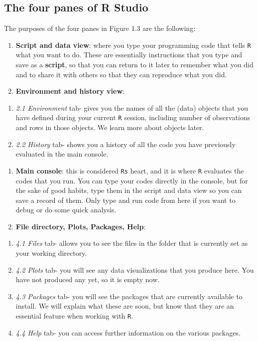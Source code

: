 \documentclass[
]{book}
\begin{document}
\hypertarget{the-four-panes-of-r-studio}{%
\subsection{The four panes of R Studio}\label{the-four-panes-of-r-studio}}

The purposes of the four panes in Figure 1.3 are the following:

\begin{enumerate}
\def\labelenumi{\arabic{enumi}.}
\item
  \textbf{Script and data view}: where you type your programming code that tells \texttt{R} what you want to do. These are essentially instructions that you type and save as a \textbf{script}, so that you can return to it later to remember what you did and to share it with others so that they can reproduce what you did.
\item
  \textbf{Environment and history view}:
\end{enumerate}

\begin{enumerate}
\def\labelenumi{\roman{enumi})}
\item
  \emph{2.1 Environment} tab- gives you the names of all the (data) objects that you have defined during your current \texttt{R} session, including number of observations and rows in those objects. We learn more about objects later.
\item
  \emph{2.2 History} tab- shows you a history of all the code you have previously evaluated in the main console.
\end{enumerate}

\begin{enumerate}
\def\labelenumi{\arabic{enumi}.}
\setcounter{enumi}{2}
\item
  \textbf{Main console}: this is considered \texttt{R\textquotesingle{}s} heart, and it is where \texttt{R} evaluates the codes that you run. You can type your codes directly in the console, but for the sake of good habits, type them in the script and data view so you can save a record of them. Only type and run code from here if you want to debug or do some quick analysis.
\item
  \textbf{File directory, Plots, Packages, Help}:
\end{enumerate}

\begin{enumerate}
\def\labelenumi{\roman{enumi})}
\item
  \emph{4.1 Files} tab- allows you to see the files in the folder that is currently set as your working directory.
\item
  \emph{4.2 Plots} tab- you will see any data visualizations that you produce here. You have not produced any yet, so it is empty now.
\item
  \emph{4.3 Packages} tab- you will see the packages that are currently available to install. We will explain what these are soon, but know that they are an essential feature when working with \texttt{R}.
\item
  \emph{4.4 Help} tab- you can access further information on the various packages.
\end{enumerate}
\end{document}
